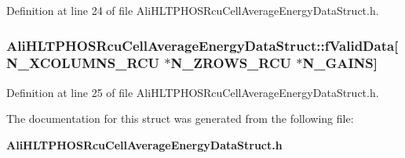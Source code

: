 Definition at line 24 of file Ali\-HLTPHOSRcu\-Cell\-Average\-Energy\-Data\-Struct.h.
\subsubsection{ {\bf Ali\-HLTPHOSRcu\-Cell\-Average\-Energy\-Data\-Struct::f\-Valid\-Data}[N\_\-XCOLUMNS\_\-RCU $\ast$N\_\-ZROWS\_\-RCU $\ast$N\_\-GAINS]}\label{structAliHLTPHOSRcuCellAverageEnergyDataStruct_o1}




Definition at line 25 of file Ali\-HLTPHOSRcu\-Cell\-Average\-Energy\-Data\-Struct.h.

The documentation for this struct was generated from the following file:\begin{CompactItemize}
\item 
{\bf Ali\-HLTPHOSRcu\-Cell\-Average\-Energy\-Data\-Struct.h}\end{CompactItemize}
